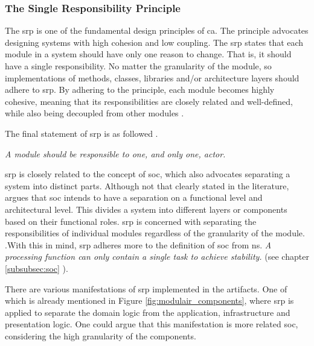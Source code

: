 \subsubsection*{The Single Responsibility Principle} \label{subsubsec:srp}

The \gls{srp} is one of the fundamental design principles of \gls{ca}. The principle
advocates designing systems with high cohesion and low coupling. The \gls{srp} states that
each module in a system should have only one reason to change. That is, it should have a
single responsibility. No matter the granularity of the module, so implementations of
methods, classes, libraries and/or architecture layers should adhere to \gls{srp}. By
adhering to the principle, each module becomes highly cohesive, meaning that its
responsibilities are closely related and well-defined, while also being decoupled from
other modules \parencite[81]{robert_c_martin_clean_2018}.

The final statement of \gls{srp} is as followed
\parencite[82]{robert_c_martin_clean_2018}.

\begin{tcolorbox}[boxrule=0.1pt, colback=mygray, title=\acrlong{soc} ,colbacktitle=gray]
    \textit{A module should	be responsible to one, and only one, actor.}
\end{tcolorbox}

\gls{srp} is closely related to the concept of \gls{soc}, which also advocates separating
a system into distinct parts. Although not that clearly stated in the literature,
\citeauthor{robert_c_martin_clean_2018} argues that \gls{soc} intends to have a separation
on a functional level and architectural level. This divides a system into different layers
or components based on their functional roles. \gls{srp} is concerned with separating the
responsibilities of individual modules regardless of the granularity of the module.
\parencite[205]{robert_c_martin_clean_2018}.With this in mind, \gls{srp} adheres more to
the definition of \gls{soc} from \gls{ns}. \textit{A processing function can only contain
a single task to achieve stability.} (see chapter \ref{subsubsec:soc}
).

There are various manifestations of \gls{srp} implemented in the artifacts. One of which is
already mentioned in Figure \ref{fig:modulair_components}, where \gls{srp} is applied to
separate the domain logic from the application, infrastructure and presentation logic. One
could argue that this manifestation is more related \gls{soc}, considering the high
granularity of the components.

